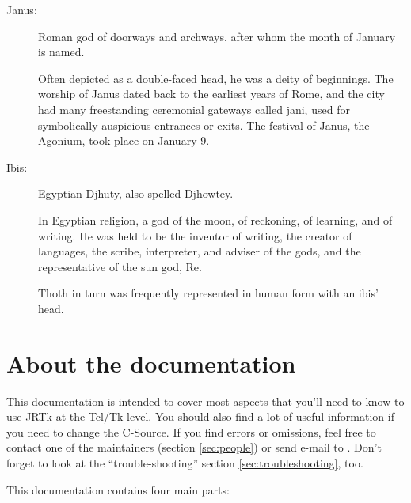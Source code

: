 \documentclass[a4paper,twoside]{book}
\begin{document}
\begin{description}
\item[Janus:] Roman god of doorways and archways, after whom the 
    month of January is named.

    Often depicted  as  a  double-faced   head,  he  was  a  deity  of
    beginnings. The worship of Janus dated  back to the earliest years
    of Rome, and the   city had many freestanding  ceremonial gateways
    called  jani,    used for   symbolically auspicious   entrances or
    exits.  The festival of Janus,  the Agonium, took place on January
    9.

\item[Ibis:] Egyptian Djhuty, also spelled Djhowtey.

    In  Egyptian religion,  a  god of   the   moon, of reckoning,   of
    learning, and of  writing.  He  was held   to be the  inventor  of
    writing, the  creator of languages,   the scribe, interpreter, and
    adviser of the gods, and the representative of the sun god, Re.

    Thoth in turn was frequently represented in human form with an
    ibis' head.

\end{description}

\section{About the documentation} \label{basics:doku}

This documentation is intended to cover most  aspects that you'll need
to know to use JRTk at the Tcl/Tk level. You should also find a lot of
useful information  if you need to change  the C-Source.   If you find
errors or   omissions, feel  free  to contact  one of  the maintainers
(section        \ref{sec:people})        or    send        e-mail   to
. Don't
forget    to    look    at     the     ``trouble-shooting''    section
\ref{sec:troubleshooting}, too.


This documentation contains four main parts:
\end{document}
